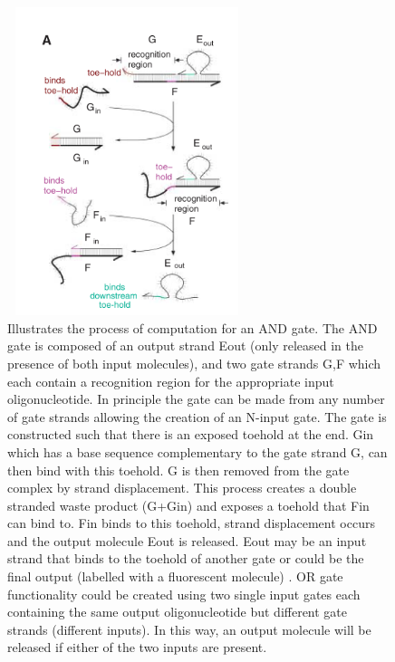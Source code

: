 \documentclass[11pt,a4paper,portrait]{article}
\begin{document}
\clearpage
\begin{figure}[ht!]
\centering
\includegraphics[width=70mm, height=90mm]{enzymefree.png}
\caption{Illustrates the process of computation for an AND gate. The AND gate is composed of an output strand Eout (only released in the presence of both input molecules), and two gate strands G,F which each contain a recognition region for the appropriate input oligonucleotide. In principle the gate can be made from any number of gate strands allowing the creation of an N-input gate. The gate is constructed such that there is an exposed toehold at the end. Gin which has a base sequence complementary to the gate strand G, can then bind with this toehold. G is then removed from the gate complex by strand displacement. This process creates a double stranded waste product (G+Gin) and exposes a toehold that Fin can bind to. Fin binds to this toehold, strand displacement occurs and the output molecule Eout is released. Eout may be an input strand that binds to the toehold of another gate or could be the final output (labelled with a fluorescent molecule) \cite{enzymefree}. OR gate functionality could be created using two single input gates each containing the same output oligonucleotide but different gate strands (different inputs). In this way, an output molecule will be released if either of the two inputs are present. \label{enzymefree}}
\end{figure}
\end{document}
